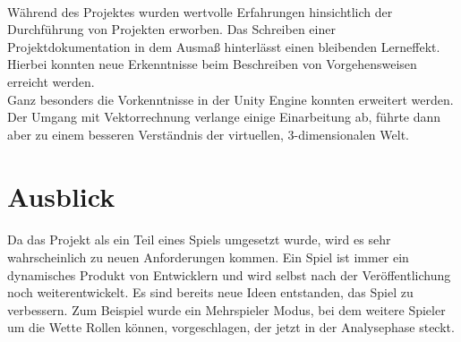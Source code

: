 \paragraph{}
Während des Projektes wurden wertvolle Erfahrungen hinsichtlich der Durchführung von Projekten erworben. Das Schreiben einer Projektdokumentation in dem Ausmaß hinterlässt einen bleibenden Lerneffekt. Hierbei konnten neue Erkenntnisse beim Beschreiben von Vorgehensweisen erreicht werden.
\\
Ganz besonders die Vorkenntnisse in der Unity Engine konnten erweitert werden. Der Umgang mit Vektorrechnung verlange einige Einarbeitung ab, führte dann aber zu einem besseren Verständnis der virtuellen, 3-dimensionalen Welt.

\section{Ausblick}
\paragraph{}
Da das Projekt als ein Teil eines Spiels umgesetzt wurde, wird es sehr wahrscheinlich zu neuen Anforderungen kommen. Ein Spiel ist immer ein dynamisches Produkt von Entwicklern und wird selbst nach der Veröffentlichung noch weiterentwickelt. Es sind bereits neue Ideen entstanden, das Spiel zu verbessern. Zum Beispiel wurde ein Mehrspieler Modus, bei dem weitere Spieler um die Wette Rollen können, vorgeschlagen, der jetzt in der Analysephase steckt.

\endgroup







